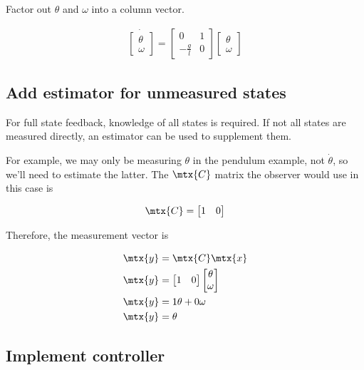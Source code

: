 Factor out $\theta$ and $\omega$ into a column vector.

\begin{align}
  \dot{
  \begin{bmatrix}
    \theta \\
    \omega
  \end{bmatrix}} =
  \begin{bmatrix}
    0 & 1 \\
    -\frac{g}{l} & 0
  \end{bmatrix}
  \begin{bmatrix}
    \theta \\
    \omega
  \end{bmatrix}
\end{align}

\subsection{Add estimator for unmeasured states}

For full \gls{state} feedback, knowledge of all \glspl{state} is required. If
not all \glspl{state} are measured directly, an estimator can be used to
supplement them.

For example, we may only be measuring $\theta$ in the pendulum example, not
$\dot{\theta}$, so we'll need to estimate the latter. The $\mtx{C}$ matrix the
\gls{observer} would use in this case is

\begin{equation*}
  \mtx{C} = \begin{bmatrix}
    1 & 0 \\
  \end{bmatrix}
\end{equation*}

Therefore, the measurement vector is

\begin{align*}
  \mtx{y} &= \mtx{C}\mtx{x} \\
  \mtx{y} &= \begin{bmatrix}
    1 & 0
  \end{bmatrix}
  \begin{bmatrix}
    \theta \\
    \omega
  \end{bmatrix} \\
  \mtx{y} &= 1\theta + 0\omega \\
  \mtx{y} &= \theta
\end{align*}

\subsection{Implement controller}

